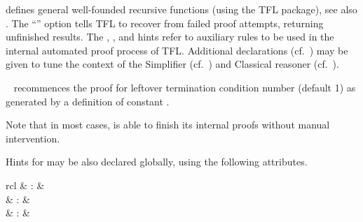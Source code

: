 \begin{isabellebody}
\begin{isamarkuptext}
  \begin{description}

  \item \hyperlink{command.HOL.recdef}{\mbox{}} defines general well-founded
  recursive functions (using the TFL package), see also
  \cite{isabelle-HOL}.  The ``'' option tells
  TFL to recover from failed proof attempts, returning unfinished
  results.  The , , and  hints refer to auxiliary rules to be used in the internal
  automated proof process of TFL.  Additional \hyperlink{syntax.clasimpmod}{\mbox{}}
  declarations (cf.\ ) may be given to tune the
  context of the Simplifier (cf.\ ) and
  Classical reasoner (cf.\ ).

  \item \hyperlink{command.HOL.recdef-tc}{\mbox{}}~ recommences the
  proof for leftover termination condition number  (default
  1) as generated by a \hyperlink{command.HOL.recdef}{\mbox{}} definition of
  constant .

  Note that in most cases, \hyperlink{command.HOL.recdef}{\mbox{}} is able to finish
  its internal proofs without manual intervention.

  \end{description}

  \medskip Hints for \hyperlink{command.HOL.recdef}{\mbox{}} may be also declared
  globally, using the following attributes.

  \begin{matharray}{rcl}
    \hypertarget{attribute.HOL.recdef-simp}{\hyperlink{attribute.HOL.recdef-simp}{\mbox{}}} & : &  \\
    \hypertarget{attribute.HOL.recdef-cong}{\hyperlink{attribute.HOL.recdef-cong}{\mbox{}}} & : &  \\
    \hypertarget{attribute.HOL.recdef-wf}{\hyperlink{attribute.HOL.recdef-wf}{\mbox{}}} & : &  \\
  \end{matharray}


\end{isamarkuptext}
\end{isabellebody}
